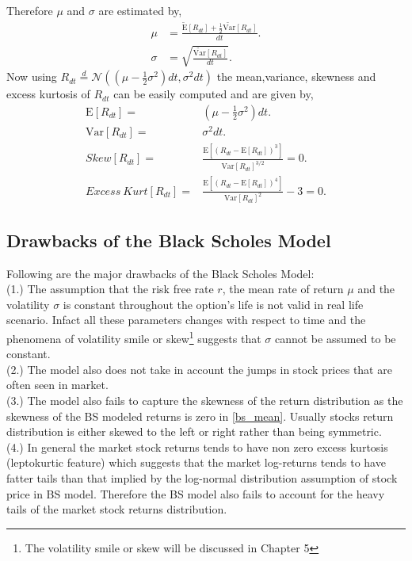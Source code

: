 \documentclass[12pt]{report}
\newcommand{\E}{\mathrm{E}}
\newcommand{\Var}{\mathrm{Var}}
\begin{document}
Therefore $\mu$ and $\sigma$ are estimated by,
\begin{equation}
 \begin{aligned}
    \mu&= \frac{\tilde{\E}[R_{dt}] + \frac{1}{2} \tilde{\Var}[R_{dt}]}{dt}.\\
    \sigma &= \sqrt{\frac{\tilde{\Var}[R_{dt}]}{dt}}.
 \end{aligned}
\label{bs_mu} 
\end{equation}
Now using $R_{dt}  \stackrel{d}{=} \mathcal{N}\left((\mu - \frac{1}{2} \sigma^{2}) dt, \sigma^{2} dt\right)  $ the mean,variance, skewness and excess kurtosis of $R_{dt}$ can be easily computed and are given by,\\
\begin{equation}
\begin{aligned}
\E[R_{dt}] = & (\mu - \frac{1}{2} \sigma^{2}) dt.\\
\Var[R_{dt}] = & \sigma^{2} dt.\\
Skew[R_{dt}] = &\frac{\E[(R_{dt} - \E[R_{dt}])^{3}]}{\Var[R_{dt}]^{3/2}} = 0. \\
Excess~Kurt[R_{dt}] = & \frac{\E[(R_{dt} - \E[R_{dt}])^{4}]}{\Var[R_{dt}]^{2}} - 3 = 0.
\end{aligned}
\label{bs_mean}
\end{equation}
\subsection{Drawbacks of the Black Scholes Model}
Following are the major drawbacks of the Black Scholes Model:\\
(1.) The assumption that the risk free rate $r$, the mean rate of return $\mu$ and the volatility $\sigma$ is constant throughout the option's life is not valid in real life scenario. Infact all these parameters changes with respect to time and the phenomena of volatility smile or skew\footnote{The volatility smile or skew will be discussed in Chapter 5} suggests that $\sigma $ cannot be assumed to be constant.\\
(2.) The model also does not take in account the jumps in stock prices that are often seen in market.\\
(3.) The model also fails to capture the skewness of the return distribution as the skewness of the BS modeled returns is zero in \ref{bs_mean}. Usually stocks return distribution is either skewed to the left or right rather than being symmetric.\\ (4.) In general the market stock returns tends to have non zero excess kurtosis (leptokurtic feature) which suggests that the market log-returns tends to have fatter tails than that implied by the log-normal distribution assumption of stock price in BS model. Therefore the BS model also fails to account for the heavy tails of the market stock returns distribution.
\end{document}
